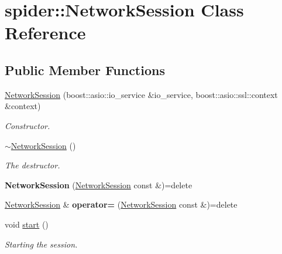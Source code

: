 \hypertarget{classspider_1_1_network_session}{}\section{spider\+:\+:Network\+Session Class Reference}
\label{classspider_1_1_network_session}
\subsection*{Public Member Functions}
\begin{DoxyCompactItemize}
\item 
\hyperlink{classspider_1_1_network_session_a1049001c94e30b57a9986a1ec26d1b0c}{Network\+Session} (boost\+::asio\+::io\+\_\+service \&io\+\_\+service, boost\+::asio\+::ssl\+::context \&context)
\begin{DoxyCompactList}\small\item\em Constructor. \end{DoxyCompactList}\item 
\mbox{\label{classspider_1_1_network_session_ab5de365f6424a495036c9e812f0f4ad6}} 
\hyperlink{classspider_1_1_network_session_ab5de365f6424a495036c9e812f0f4ad6}{$\sim$\+Network\+Session} ()
\begin{DoxyCompactList}\small\item\em The destructor. \end{DoxyCompactList}\item 
\mbox{\label{classspider_1_1_network_session_a3ed991568f236bd39ceb0b80f88b455e}} 
{\bfseries Network\+Session} (\hyperlink{classspider_1_1_network_session}{Network\+Session} const \&)=delete
\item 
\mbox{\label{classspider_1_1_network_session_afa533f49e902b6fb2a0317c882c5dba9}} 
\hyperlink{classspider_1_1_network_session}{Network\+Session} \& {\bfseries operator=} (\hyperlink{classspider_1_1_network_session}{Network\+Session} const \&)=delete
\item 
\mbox{\label{classspider_1_1_network_session_a7a4f39e7b5fe0b1784d8399f8299e861}} 
void \hyperlink{classspider_1_1_network_session_a7a4f39e7b5fe0b1784d8399f8299e861}{start} ()
\begin{DoxyCompactList}\small\item\em Starting the session. \end{DoxyCompactList}\item 

\end{DoxyCompactItemize}
